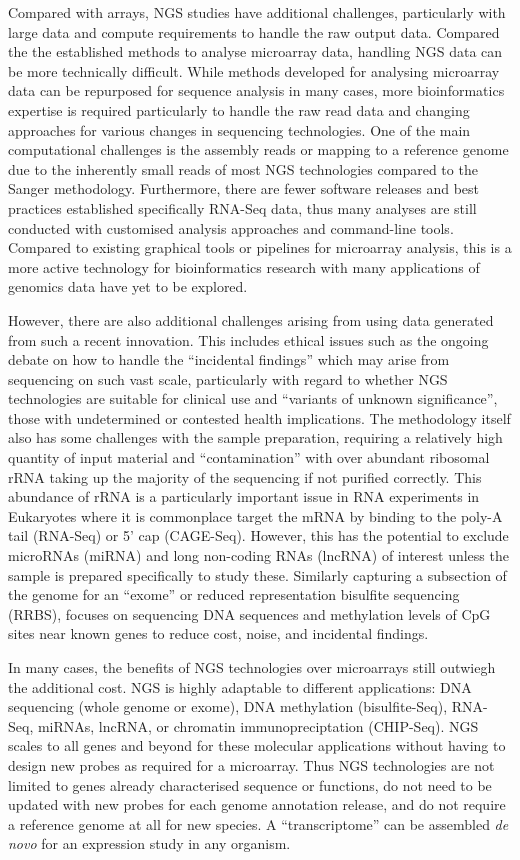 Compared with arrays, NGS studies have additional challenges, particularly with large data and compute requirements to handle the raw output data. Compared the the established methods to analyse microarray data, handling NGS data can be more technically difficult. While methods developed for analysing microarray data can be repurposed for sequence analysis in many cases, more bioinformatics expertise is required particularly to handle the raw read data and changing approaches for various changes in sequencing technologies. One of the main computational challenges is the assembly reads or mapping to a reference genome due to the inherently small reads of most NGS technologies compared to the Sanger methodology. Furthermore, there are fewer software releases and best practices established specifically RNA-Seq data, thus many analyses are still conducted with customised analysis approaches and command-line tools. Compared to existing graphical tools or pipelines for microarray analysis, this is a more active technology for bioinformatics research with many applications of genomics data have yet to be explored.

However, there are also additional challenges arising from using data generated from such a recent innovation. This includes ethical issues such as the ongoing debate on how to handle the ``incidental findings'' which may arise from sequencing on such vast scale, particularly with regard to whether NGS technologies are suitable for clinical use and ``variants of unknown significance'', those with undetermined or contested health implications. The methodology itself also has some challenges with the sample preparation, requiring a relatively high quantity of input material and ``contamination'' with over abundant ribosomal rRNA taking up the majority of the sequencing if not purified correctly. This abundance of rRNA is a particularly important issue in RNA experiments in Eukaryotes where it is commonplace target the mRNA by binding to the poly-A tail (RNA-Seq) or 5' cap (CAGE-Seq). However, this has the potential to exclude microRNAs (miRNA) and long non-coding RNAs (lncRNA) of interest unless the sample is prepared specifically to study these. Similarly capturing a subsection of the genome for an ``exome'' or reduced representation bisulfite sequencing (RRBS), focuses on sequencing DNA sequences and methylation levels of CpG sites near known genes to reduce cost, noise, and incidental findings.

In many cases, the benefits of NGS technologies over microarrays still outwiegh the additional cost. NGS is highly adaptable to different applications: DNA sequencing (whole genome or exome), DNA methylation (bisulfite-Seq), RNA-Seq, miRNAs, lncRNA, or chromatin immunopreciptation (CHIP-Seq). NGS scales to all genes and beyond for these molecular applications without having to design new probes as required for a microarray. Thus NGS technologies are not limited to genes already characterised sequence or functions, do not need to be updated with new probes for each genome annotation release, and do not require a reference genome at all for new species. A ``transcriptome'' can be assembled \textit{de novo} for an expression study in any organism.

